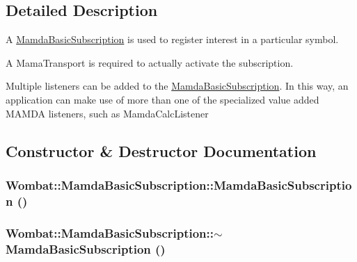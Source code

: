 \subsection{Detailed Description}
A \hyperlink{classWombat_1_1MamdaBasicSubscription}{Mamda\-Basic\-Subscription} is used to register interest in a particular symbol. 

A Mama\-Transport is required to actually activate the subscription.

Multiple listeners can be added to the \hyperlink{classWombat_1_1MamdaBasicSubscription}{Mamda\-Basic\-Subscription}. In this way, an application can make use of more than one of the specialized value added MAMDA listeners, such as Mamda\-Calc\-Listener 



\subsection{Constructor \& Destructor Documentation}
\hypertarget{classWombat_1_1MamdaBasicSubscription_65cfae1eec84ef7ca6cc8861408d1c20}{
\subsubsection[MamdaBasicSubscription]{\setlength{\rightskip}{0pt plus 5cm}Wombat::Mamda\-Basic\-Subscription::Mamda\-Basic\-Subscription ()}}
\label{classWombat_1_1MamdaBasicSubscription_65cfae1eec84ef7ca6cc8861408d1c20}


\hypertarget{classWombat_1_1MamdaBasicSubscription_32f280431e1a02439d2c6e81f619d7d1}{
\subsubsection[$\sim$MamdaBasicSubscription]{\setlength{\rightskip}{0pt plus 5cm}Wombat::Mamda\-Basic\-Subscription::$\sim$Mamda\-Basic\-Subscription ()}}
\label{classWombat_1_1MamdaBasicSubscription_32f280431e1a02439d2c6e81f619d7d1}




